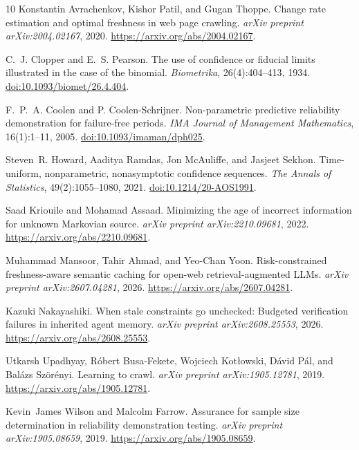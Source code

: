 \begin{thebibliography}{10}
Konstantin Avrachenkov, Kishor Patil, and Gugan Thoppe.
Change rate estimation and optimal freshness in web page crawling.
\emph{arXiv preprint arXiv:2004.02167}, 2020.
\url{https://arxiv.org/abs/2004.02167}.

C.~J. Clopper and E.~S. Pearson.
The use of confidence or fiducial limits illustrated in the case of the binomial.
\emph{Biometrika}, 26(4):404--413, 1934.
\href{https://doi.org/10.1093/biomet/26.4.404}{doi:10.1093/biomet/26.4.404}.

F.~P.~A. Coolen and P. Coolen-Schrijner.
Non-parametric predictive reliability demonstration for failure-free periods.
\emph{IMA Journal of Management Mathematics}, 16(1):1--11, 2005.
\href{https://doi.org/10.1093/imaman/dph025}{doi:10.1093/imaman/dph025}.

Steven~R. Howard, Aaditya Ramdas, Jon McAuliffe, and Jasjeet Sekhon.
Time-uniform, nonparametric, nonasymptotic confidence sequences.
\emph{The Annals of Statistics}, 49(2):1055--1080, 2021.
\href{https://doi.org/10.1214/20-AOS1991}{doi:10.1214/20-AOS1991}.

Saad Kriouile and Mohamad Assaad.
Minimizing the age of incorrect information for unknown Markovian source.
\emph{arXiv preprint arXiv:2210.09681}, 2022.
\url{https://arxiv.org/abs/2210.09681}.

Muhammad Mansoor, Tahir Ahmad, and Yeo-Chan Yoon.
Risk-constrained freshness-aware semantic caching for open-web retrieval-augmented LLMs.
\emph{arXiv preprint arXiv:2607.04281}, 2026.
\url{https://arxiv.org/abs/2607.04281}.

Kazuki Nakayashiki.
When stale constraints go unchecked: Budgeted verification failures in inherited agent memory.
\emph{arXiv preprint arXiv:2608.25553}, 2026.
\url{https://arxiv.org/abs/2608.25553}.

Utkarsh Upadhyay, R{\'o}bert Busa-Fekete, Wojciech Kot{\l}owski, D{\'a}vid P{\'a}l, and Bal{\'a}zs Sz{\"o}r{\'e}nyi.
Learning to crawl.
\emph{arXiv preprint arXiv:1905.12781}, 2019.
\url{https://arxiv.org/abs/1905.12781}.

Kevin~James Wilson and Malcolm Farrow.
Assurance for sample size determination in reliability demonstration testing.
\emph{arXiv preprint arXiv:1905.08659}, 2019.
\url{https://arxiv.org/abs/1905.08659}.
\end{thebibliography}

